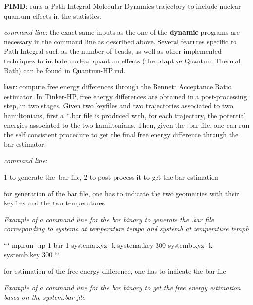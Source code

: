 \begin{DoxyEnumerate}
\item {\bfseries P\-I\-M\-D}\-: runs a Path Integral Molecular Dynamics trajectory to include nuclear quantum effects in the statistics.
\begin{DoxyItemize}
\item {\itshape command line}\-: the exact same inputs as the one of the {\bfseries dynamic} programs are necessary in the command line as described above. Several features specific to Path Integral such as the number of beads, as well as other implemented techniques to include nuclear quantum effects (the adaptive Quantum Thermal Bath) can be found in Quantum-\/\-H\-P.\-md.
\end{DoxyItemize}
\item {\bfseries bar}\-: compute free energy differences through the Bennett Acceptance Ratio estimator. In Tinker-\/\-H\-P, free energy differences are obtained in a post-\/processing step, in two stages. Given two keyfiles and two trajectories associated to two hamiltonians, first a $\ast$.bar file is produced with, for each trajectory, the potential energies associated to the two hamiltonians. Then, given the .bar file, one can run the self consistent procedure to get the final free energy difference through the bar estimator.
\begin{DoxyItemize}
\item {\itshape command line}\-:
\begin{DoxyItemize}
\item 1 to generate the .bar file, 2 to post-\/process it to get the bar estimation
\item for generation of the bar file, one has to indicate the two geometries with their keyfiles and the two temperatures
\end{DoxyItemize}

{\itshape Example of a command line for the bar binary to generate the .bar file corresponding to systema at temperature tempa and systemb at temperature tempb}
\end{DoxyItemize}
\end{DoxyEnumerate}

``` mpirun -\/np 1 bar 1 systema.\-xyz -\/k systema.\-key 300 systemb.\-xyz -\/k systemb.\-key 300 ```


\begin{DoxyItemize}
\item for estimation of the free energy difference, one has to indicate the bar file

{\itshape Example of a command line for the bar binary to get the free energy estimation based on the system.\-bar file}
\end{DoxyItemize}

